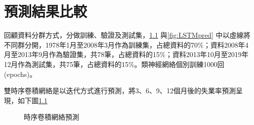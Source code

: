 \documentclass[oneside]{book}
\begin{document}
\hypertarget{ux9810ux6e2cux7d50ux679cux6bd4ux8f03}{%
\chapter{預測結果比較}\label{ux9810ux6e2cux7d50ux679cux6bd4ux8f03}}

回顧資料分群方式，分做訓練、驗證及測試集，\ref{fig:TCNpred} 與\ref{fig:LSTMpred} 中以虛線將不同群分開，1978年1月至2008年3月作為訓練集，占總資料的70\%；資料2008年4月至2013年9月作為驗證集，共78筆，占總資料的15\%；資料2013年10月至2019年12月作為測試集，共75筆，占總資料的15\%。類神經網絡個別訓練1000回(epochs)。

雙時序卷積網絡是以迭代方式進行預測，將3、6、9、12個月後的失業率預測呈現，如下圖\ref{fig:TCNpred}

\begin{figure}

{\centering {}\newline{}

}

\caption{時序卷積網絡預測}\label{fig:TCNpred}
\end{figure}
\end{document}

